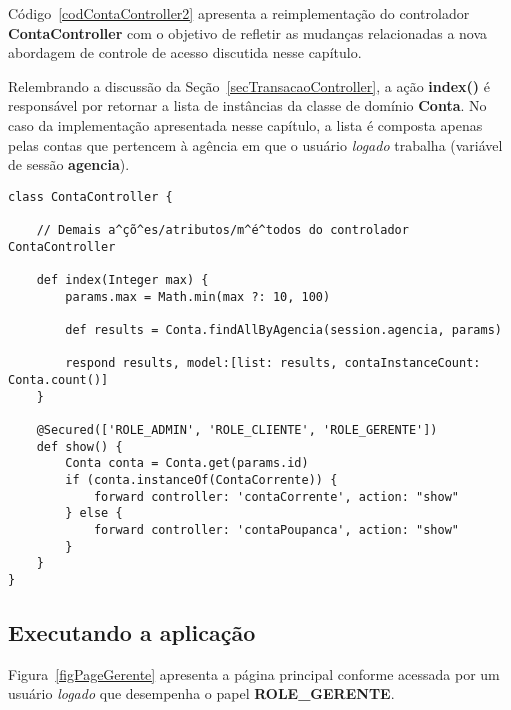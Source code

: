 \vspace{0.5cm}

Código~\ref{codContaController2} apresenta a reimplementação do controlador {\bf
  ContaController} com  o objetivo de  refletir as mudanças relacionadas  a nova
abordagem de controle de acesso discutida nesse capítulo.  

\vspace{0.2cm}

Relembrando  a  discussão  da  Seção~\ref{secTransacaoController}, a  ação  {\bf
  index()} é responsável por retornar a lista de instâncias da classe de domínio
{\bf Conta}.   No caso  da implementação apresentada  nesse capítulo, a  lista é
composta  apenas pelas  contas que  pertencem à  agência em  que o  usuário {\it
  logado} trabalha (variável de sessão {\bf agencia}).

\begin{lstlisting}[caption=Controlador    {\bf   ContaController},   frame=trBL,
    float=htbp, label=codContaController2] 
class ContaController {

    // Demais a^çõ^es/atributos/m^é^todos do controlador ContaController
    
    def index(Integer max) {
        params.max = Math.min(max ?: 10, 100)
        
        def results = Conta.findAllByAgencia(session.agencia, params)
                
        respond results, model:[list: results, contaInstanceCount: Conta.count()]
    }
    
    @Secured(['ROLE_ADMIN', 'ROLE_CLIENTE', 'ROLE_GERENTE'])
    def show() {
        Conta conta = Conta.get(params.id)
        if (conta.instanceOf(ContaCorrente)) {
            forward controller: 'contaCorrente', action: "show"
        } else {
            forward controller: 'contaPoupanca', action: "show"
        }
    }
}

\end{lstlisting}

\subsection{Executando a aplicação}

\vspace{0.5cm}

Figura~\ref{figPageGerente} apresenta  a página principal  conforme acessada por
um usuário {\it logado} que desempenha o papel {\bf ROLE\_GERENTE}. 

